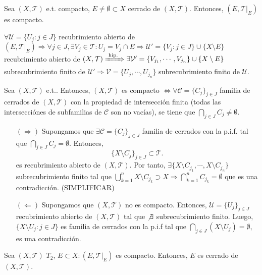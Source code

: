 \begin{prop}
  Sea $( X, \mathcal{T} )$ e.t. compacto, $E \neq \emptyset \subset X$ cerrado de $ ( X, \mathcal{T} )$. Entonces, $( E, \mathcal{T}|_{E})$ es compacto.
\end{prop}

 \begin{dem}
   $\forall \mathcal{U} = \{ U_{j} : j \in J \}$ recubrimiento abierto de $( E, \mathcal{T}|_{E}) \Rightarrow \forall j \in J, \exists V_{j} \in \mathcal{T} :  U_{j} = V_{j} \cap E \Rightarrow \mathcal{U}' = \{ V_{j} : j \in J \} \cup \{  X \setminus E \}$ recubrimiento abierto de $( X, \mathcal{T} ) \xRightarrow[]{ \text{ hip. } } \exists \mathcal{V}' = \{  V_{j_{1}}, \cdots, V_{j_{n}} \} \cup \{  X \setminus E \}$ subrecubrimiento finito de $\mathcal{U'} \Rightarrow \mathcal{V} = \{ U_{j}, \cdots, U_{j_{n}} \}$ subrecubrimiento finito de $\mathcal{U}$.
 \end{dem}

 \begin{prop}
   Sea $( X, \mathcal{T} )$ e.t.. Entonces, $( X, \mathcal{T} )$ es compacto $ \Leftrightarrow \forall \mathcal{C} = \{ C_{j} \}_{j \in J}$ familia de cerrados de $( X, \mathcal{T} )$ con la propiedad de intersección finita (todas las intersecciónes de subfamilias de $\mathcal{C}$ son no vacías), se tiene que $\bigcap_{j \in J} C_{j} \neq \emptyset$.
 \end{prop}

 \begin{dem}
   \begin{enumerate}[label=(\roman*)]
     \item []
     \item [$(\Rightarrow)$] Supongamos que $\exists \mathcal{C} = \{ C_{j} \}_{j \in J}$ familia de cerrados con la p.i.f. tal que $\bigcap_{j \in J} C_{j} = \emptyset$. Entonces,
       \[
         \{ X \setminus C_{j} \}_{j \in J} \subset \mathcal{T}.
       \]
       es recubrimiento abierto de $( X, \mathcal{T} )$. Por tanto, $\exists \{ X \setminus C_{j_{1}}, \cdots, X \setminus C_{j_{n}} \}$ subrecubrimiento finito tal que $ \bigcup_{k = 1}^{n} X \setminus C_{j_{k}} \supset X \Rightarrow \bigcap_{k = 1}^{n} C_{j_{k}} = \emptyset $ que es una contradicción. (SIMPLIFICAR)
       
     \item [$(\Leftarrow)$] Supongamos que $( X, \mathcal{T} )$ no es compacto. Entonces, $\mathcal{U} = \{ U_{j} \}_{j \in J}$ recubrimiento abierto de $( X, \mathcal{T} )$ tal que $\not\exists$ subrecubrimiento finito. Luego, $\{ X \setminus U_{j} : j \in J \}$ es familia de cerrados con la p.i.f tal que $\bigcap_{j \in J}(X \setminus U_{j}) = \emptyset$, es una contradicción.
   \end{enumerate}
 \end{dem}

 \begin{prop}
   Sea $( X, \mathcal{T} )$ $T_{2}$, $E \subset X : ( E, \mathcal{T}|_{E})$ es compacto. Entonces, $E$ es cerrado de $( X, \mathcal{T} )$.
 \end{prop}
